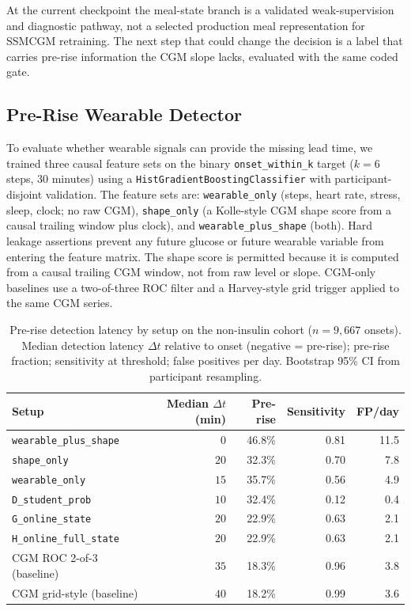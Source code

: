At the current checkpoint the meal-state branch is a validated weak-supervision and diagnostic pathway, not a selected production meal representation for SSMCGM retraining. The next step that could change the decision is a label that carries pre-rise information the CGM slope lacks, evaluated with the same coded gate.

\subsection{Pre-Rise Wearable Detector}
\label{subsec:prerise-wearable-detector}

To evaluate whether wearable signals can provide the missing lead time, we trained three causal feature sets on the binary \texttt{onset\_within\_k} target ($k = 6$ steps, 30 minutes) using a \texttt{HistGradientBoostingClassifier} with participant-disjoint validation. The feature sets are: \texttt{wearable\_only} (steps, heart rate, stress, sleep, clock; no raw CGM), \texttt{shape\_only} (a Kolle-style CGM shape score from a causal trailing window plus clock), and \texttt{wearable\_plus\_shape} (both). Hard leakage assertions prevent any future glucose or future wearable variable from entering the feature matrix. The shape score is permitted because it is computed from a causal trailing CGM window, not from raw level or slope. CGM-only baselines use a two-of-three ROC filter and a Harvey-style grid trigger applied to the same CGM series.

\begin{table}[t]
    \centering
    \caption{Pre-rise detection latency by setup on the non-insulin cohort ($n = 9{,}667$ onsets). Median detection latency $\Delta t$ relative to onset (negative = pre-rise); pre-rise fraction; sensitivity at threshold; false positives per day. Bootstrap 95\% CI from participant resampling.}
    \label{tab:prerise-detection-latency}
    \begin{tabular}{lrrrr}
        \toprule
        Setup & Median $\Delta t$ (min) & Pre-rise & Sensitivity & FP/day \\
        \midrule
        \texttt{wearable\_plus\_shape} & $0$   & 46.8\% & 0.81 & 11.5 \\
        \texttt{shape\_only}          & $20$  & 32.3\% & 0.70 &  7.8 \\
        \texttt{wearable\_only}       & $15$  & 35.7\% & 0.56 &  4.9 \\
        \texttt{D\_student\_prob}     & $10$  & 32.4\% & 0.12 &  0.4 \\
        \texttt{G\_online\_state}     & $20$  & 22.9\% & 0.63 &  2.1 \\
        \texttt{H\_online\_full\_state} & $20$ & 22.9\% & 0.63 & 2.1 \\
        CGM ROC 2-of-3 (baseline)    & $35$  & 18.3\% & 0.96 &  3.8 \\
        CGM grid-style (baseline)    & $40$  & 18.2\% & 0.99 &  3.6 \\
        \bottomrule
    \end{tabular}
\end{table}

